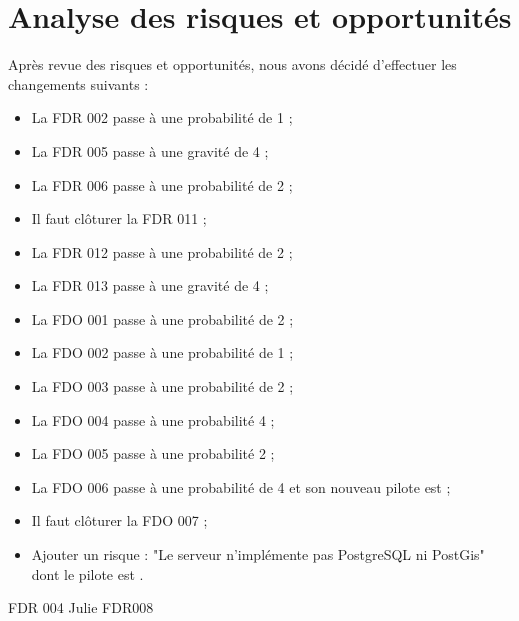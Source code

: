 \documentclass [a4paper] {article}
\begin{document}
\section{Analyse des risques et opportunités}
Après revue des risques et opportunités, nous avons décidé d'effectuer les changements suivants :
\begin{itemize}
\item La FDR 002 passe à une probabilité de 1 ;
\item La FDR 005 passe à une gravité de 4 ;
\item La FDR 006 passe à une probabilité de 2 ;
\item Il faut clôturer la FDR 011 ;
\item La FDR 012 passe à une probabilité de 2 ;
\item La FDR 013 passe à une gravité de 4 ;
\item La FDO 001 passe à une probabilité de 2 ;
\item La FDO 002 passe à une probabilité de 1 ;
\item La FDO 003 passe à une probabilité de 2 ;
\item La FDO 004 passe à une probabilité 4 ;
\item La FDO 005 passe à une probabilité 2 ;
\item La FDO 006 passe à une probabilité de 4 et son nouveau pilote est \Michel ;
\item Il faut clôturer la FDO 007 ;


\item Ajouter un risque : "Le serveur n'implémente pas PostgreSQL ni PostGis" dont le pilote est \Sergi.
\end{itemize}

FDR 004 Julie
FDR008




\end{document}
